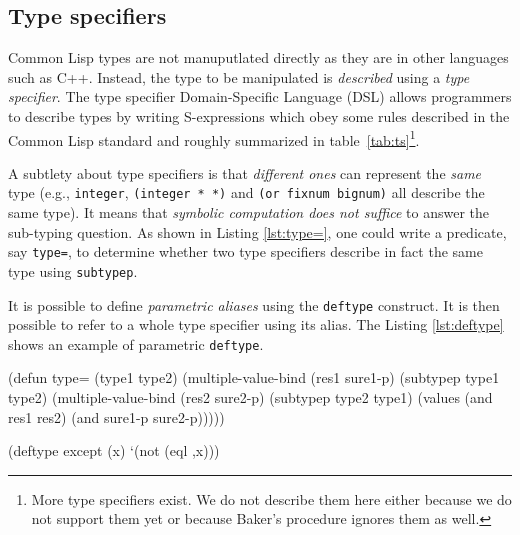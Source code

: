 \documentclass[format=sigconf]{acmart}
\newcommand\code[2][\small]{\sloppy\texttt{#1#2}}
\theoremstyle{definition}
\begin{document}
\subsection{Type specifiers}
Common Lisp types are not manuputlated directly as they are in other languages
such as C++. Instead, the type to be
manipulated is \emph{described} using a \emph{type specifier}.
The type specifier Domain-Specific Language (DSL) allows programmers to
describe types by writing S-expressions which obey some rules described in the
Common Lisp standard \cite{bib:ansi.94.cl} and roughly summarized in
table~\ref{tab:ts}\footnote{More type specifiers exist. We do not describe them
  here either because we do not support them yet or because Baker's procedure
  ignores them as well.}.

A subtlety about type specifiers is that \emph{different ones} can
represent the \textit{same} type (e.g., \code{integer}, \code{(integer * *)} and
\code{(or fixnum bignum)} all describe the same type). It means that
\emph{symbolic computation does not suffice} to answer the sub-typing question.
As shown in Listing \ref{lst:type=}, one could write a predicate, say
\code{type=}, to determine whether two type specifiers describe in fact the same
type using \code{subtypep}.

It is possible to define \emph{parametric aliases} using the \code{deftype}
construct. It is then possible to refer to a whole type specifier using its
alias. The Listing \ref{lst:deftype} shows an example of parametric
\code{deftype}.

\begin{listing}
\begin{clcode}
(defun type= (type1 type2)
  (multiple-value-bind (res1 sure1-p)
      (subtypep type1 type2)
    (multiple-value-bind (res2 sure2-p)
        (subtypep type2 type1)
      (values (and res1 res2)
              (and sure1-p sure2-p)))))
\end{clcode}
\caption{The predicate \code{type=}}
\label{lst:type=}
\end{listing}

\begin{listing}
\begin{clcode}
(deftype except (x)
  `(not (eql ,x)))
\end{clcode}
\caption{The \code{deftype} construct}
\label{lst:deftype}
\end{listing}
\end{document}
